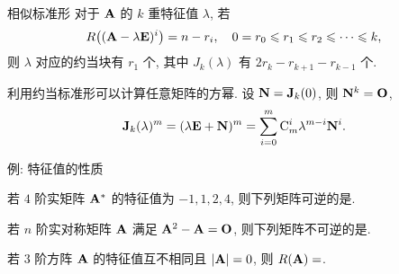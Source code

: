 \begin{frame}{相似标准形\noexer}
	\onslide<+->
	对于 ${\mathbf{A}}$ 的 $k$ 重特征值 $\lambda$,
	\onslide<+->
	若
	\[R\bigl(({\mathbf{A}}-\lambda{\mathbf{E}})^i\bigr)=n-r_i,\quad
	0=r_0\leqslant r_1\leqslant r_2\leqslant \cdots\leqslant k,\]
	\onslide<+->
	则 $\lambda$ 对应的约当块有 $r_1$ 个, 其中 $J_k(\lambda)$ 有 $2r_k-r_{k+1}-r_{k-1}$ 个.
	
	\onslide<+->
	利用约当标准形可以计算任意矩阵的方幂.
	\onslide<+->
	设 ${\mathbf{N}}={\mathbf{J}}_k(0)$, 则 ${\mathbf{N}}^k={\mathbf{O}}$,
	\[{\mathbf{J}}_k(\lambda)^m
	=(\lambda{\mathbf{E}}+{\mathbf{N}})^m=\sum_{i=0}^m {\mathrm{C}}_m^i \lambda^{m-i}{\mathbf{N}}^i.\]
\end{frame}


\begin{frame}{例: 特征值的性质}
	\onslide<+->
	\begin{exercise}
		若 $4$ 阶实矩阵 ${\mathbf{A}}^*$ 的特征值为 $-1,1,2,4$, 则下列矩阵可逆的是.
	\end{exercise}
	\onslide<+->
	\begin{exercise}
		若 $n$ 阶实对称矩阵 ${\mathbf{A}}$ 满足 ${\mathbf{A}}^2-{\mathbf{A}}={\mathbf{O}}$, 则下列矩阵不可逆的是\fillbrace{\visible<+->{C}}.
		\xx{$\bfA+2\bfE$}{$\bfA+\bfE$}{$\bfA-\bfE$}{$\bfA-2\bfE$}
	\end{exercise}
	\onslide<+->
	\begin{exercise}
		若 $3$ 阶方阵 ${\mathbf{A}}$ 的特征值互不相同且 $|{\mathbf{A}}|=0$, 则 $R({\mathbf{A}})=$\fillblank{\visible<+->{$2$}}.
	\end{exercise}
\end{frame}


